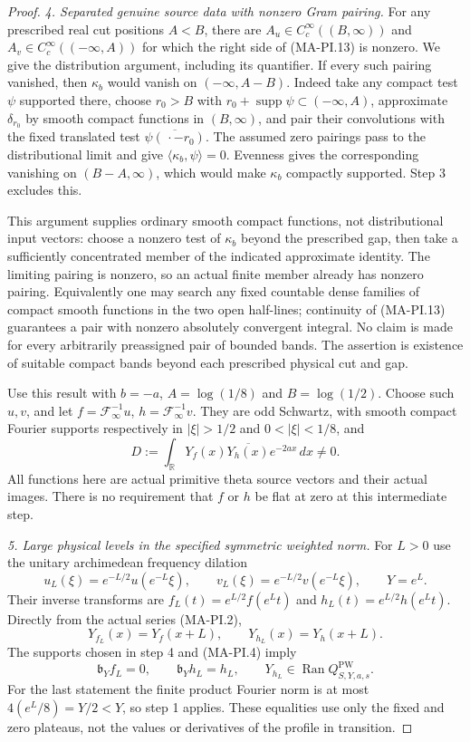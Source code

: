 \begin{proof}
\emph{4. Separated genuine source data with nonzero Gram pairing.}
For any prescribed real cut positions $A<B$, there are
$A_u\in C_c^\infty((B,\infty))$ and
$A_v\in C_c^\infty(( -\infty,A))$ for which the
right side of (MA-PI.13) is nonzero.  We give the
distribution argument, including its quantifier.
If every such pairing vanished, then
$\kappa_b$ would vanish on $(-\infty,A-B)$.
Indeed take any compact test $\psi$ supported there,
choose $r_0>B$ with $r_0+\operatorname{supp}\psi\subset
(-\infty,A)$, approximate $\delta_{r_0}$ by smooth
compact functions in $(B,\infty)$, and pair their
convolutions with the fixed translated test
$\overline{\psi(\,\cdot-r_0)}$.
The assumed zero pairings pass to the distributional
limit and give $\langle\kappa_b,\psi\rangle=0$.
Evenness gives the corresponding vanishing on
$(B-A,\infty)$, which would make $\kappa_b$ compactly
supported.  Step 3 excludes this.

This argument supplies ordinary smooth compact functions,
not distributional input vectors: choose a nonzero test
of $\kappa_b$ beyond the prescribed gap, then take a
sufficiently concentrated member of the indicated
approximate identity.  The limiting pairing is nonzero,
so an actual finite member already has nonzero pairing.
Equivalently one may search any fixed countable dense
families of compact smooth functions in the two open
half-lines; continuity of (MA-PI.13) guarantees a pair
with nonzero absolutely convergent integral.  No claim
is made for every arbitrarily preassigned pair of bounded
bands.  The assertion is existence of suitable compact
bands beyond each prescribed physical cut and gap.

Use this result with $b=-a$, $A=\log(1/8)$ and
$B=\log(1/2)$.  Choose such $u,v$, and let
$f=\mathcal F_\infty^{-1}u$,
$h=\mathcal F_\infty^{-1}v$.  They are odd Schwartz,
with smooth compact Fourier supports respectively in
$|\xi|>1/2$ and $0<|\xi|<1/8$, and
\[
 D:=\int_{\mathbb R}Y_f(x)\overline{Y_h(x)}e^{-2ax}\,dx
                           \ne0.
 \tag{MA-PI.21}
\]
All functions here are actual primitive theta source
vectors and their actual images.  There is no requirement
that $f$ or $h$ be flat at zero at this intermediate step.

\emph{5. Large physical levels in the specified symmetric weighted norm.}
For $L>0$ use the unitary archimedean frequency dilation
\[
 u_L(\xi)=e^{-L/2}u(e^{-L}\xi),\qquad
 v_L(\xi)=e^{-L/2}v(e^{-L}\xi),\qquad Y=e^L.
 \tag{MA-PI.22}
\]
Their inverse transforms are
$f_L(t)=e^{L/2}f(e^Lt)$ and
$h_L(t)=e^{L/2}h(e^Lt)$.
Directly from the actual series (MA-PI.2),
\[
       Y_{f_L}(x)=Y_f(x+L),\qquad
       Y_{h_L}(x)=Y_h(x+L).
 \tag{MA-PI.23}
\]
The supports chosen in step 4 and (MA-PI.4) imply
\[
 \mathfrak b_Yf_L=0,\qquad
 \mathfrak b_Yh_L=h_L,\qquad
 Y_{h_L}\in\operatorname{Ran}Q^{\mathrm{PW}}_{S,Y,a,s}.
 \tag{MA-PI.24}
\]
For the last statement the finite product Fourier norm
is at most $4(e^L/8)=Y/2<Y$, so step 1 applies.
These equalities use only the fixed and zero plateaus,
not the values or derivatives of the profile in transition.


\end{proof}
